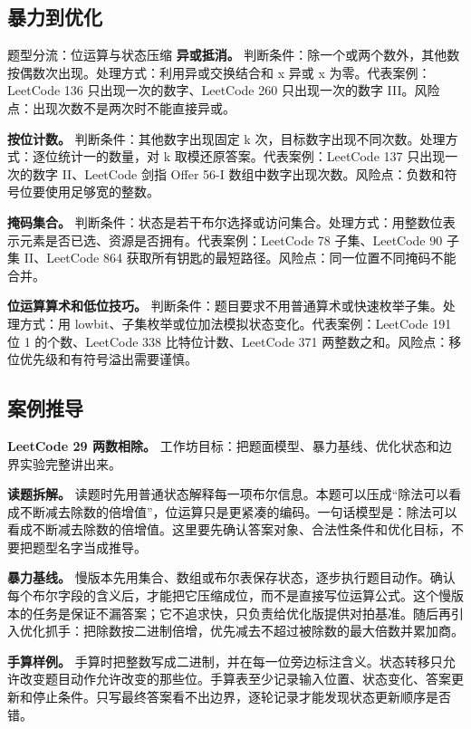 \subsection{暴力到优化}

\begin{principlebox}{题型分流：位运算与状态压缩}
\textbf{异或抵消。}
判断条件：除一个或两个数外，其他数按偶数次出现。处理方式：利用异或交换结合和 x 异或 x 为零。代表案例：LeetCode 136 只出现一次的数字、LeetCode 260 只出现一次的数字 III。风险点：出现次数不是两次时不能直接异或。

\textbf{按位计数。}
判断条件：其他数字出现固定 k 次，目标数字出现不同次数。处理方式：逐位统计一的数量，对 k 取模还原答案。代表案例：LeetCode 137 只出现一次的数字 II、LeetCode 剑指 Offer 56-I 数组中数字出现次数。风险点：负数和符号位要使用足够宽的整数。

\textbf{掩码集合。}
判断条件：状态是若干布尔选择或访问集合。处理方式：用整数位表示元素是否已选、资源是否拥有。代表案例：LeetCode 78 子集、LeetCode 90 子集 II、LeetCode 864 获取所有钥匙的最短路径。风险点：同一位置不同掩码不能合并。

\textbf{位运算算术和低位技巧。}
判断条件：题目要求不用普通算术或快速枚举子集。处理方式：用 lowbit、子集枚举或位加法模拟状态变化。代表案例：LeetCode 191 位 1 的个数、LeetCode 338 比特位计数、LeetCode 371 两整数之和。风险点：移位优先级和有符号溢出需要谨慎。

\end{principlebox}

\subsection{案例推导}

\noindent\textbf{LeetCode 29 两数相除。} 工作坊目标：把题面模型、暴力基线、优化状态和边界实验完整讲出来。

\textbf{读题拆解。} 读题时先用普通状态解释每一项布尔信息。本题可以压成“除法可以看成不断减去除数的倍增值”，位运算只是更紧凑的编码。一句话模型是：除法可以看成不断减去除数的倍增值。这里要先确认答案对象、合法性条件和优化目标，不要把题型名字当成推导。

\textbf{暴力基线。} 慢版本先用集合、数组或布尔表保存状态，逐步执行题目动作。确认每个布尔字段的含义后，才能把它压缩成位，而不是直接写位运算公式。这个慢版本的任务是保证不漏答案；它不追求快，只负责给优化版提供对拍基准。随后再引入优化抓手：把除数按二进制倍增，优先减去不超过被除数的最大倍数并累加商。

\textbf{手算样例。} 手算时把整数写成二进制，并在每一位旁边标注含义。状态转移只允许改变题目动作允许改变的那些位。手算表至少记录输入位置、状态变化、答案更新和停止条件。只写最终答案看不出边界，逐轮记录才能发现状态更新顺序是否错。

